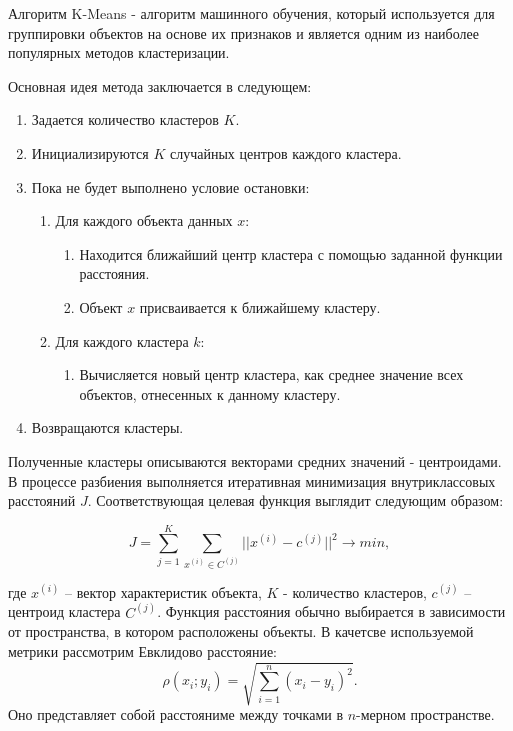 \documentclass{article}
\begin{document}
Алгоритм K-Means - алгоритм машинного обучения, который используется для группировки объектов на основе их признаков и является одним из наиболее популярных методов кластеризации.

Основная идея метода заключается в следующем:
\begin{enumerate}
\item Задается количество кластеров $K$.
\item Инициализируются $K$ случайных центров каждого кластера.
\item Пока не будет выполнено условие остановки:
\begin{enumerate}
\item Для каждого объекта данных $x$:
\begin{enumerate}
\item Находится ближайший центр кластера с помощью заданной функции расстояния.
\item Объект $x$ присваивается к ближайшему кластеру.
\end{enumerate}
\item Для каждого кластера $k$:
\begin{enumerate}
\item Вычисляется новый центр кластера, как среднее значение всех объектов, отнесенных к данному кластеру.
\end{enumerate}
\end{enumerate}
\item Возвращаются кластеры.
\end{enumerate}

Полученные кластеры описываются векторами средних значений - центроидами. В процессе разбиения выполняется итеративная минимизация внутриклассовых расстояний $J$. Соответствующая целевая функция выглядит следующим образом:

\begin{equation}
J = \sum_{j=1}^{K}  \sum_{x^{(i)} \in C^{(j)}} ||x^{(i)}-c^{(j)}||^2 \to min,
\end{equation}

где $x^{(i)}$ – вектор характеристик объекта, $K$ - количество кластеров, $c^{(j)}$ – центроид кластера $C^{(j)}$.  
Функция расстояния обычно выбирается в зависимости от пространства, в котором расположены объекты. В качетсве используемой метрики рассмотрим Евклидово расстояние:
\begin{equation}
\rho(x_{i};y_{i}) = \sqrt{\sum_{i=1}^{n} (x_{i}-y_{i})^2}.
\end{equation}
Оно представляет собой расстояниме между точками в $n$-мерном пространстве. 
\end{document}
